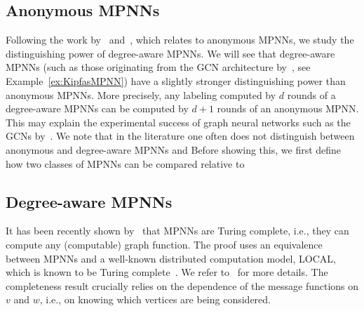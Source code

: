 
\subsection{Anonymous MPNNs}\label{subsec:aMPNNs}
Following the work by~\cite{xhlj19} and~\cite{grohewl}, which relates to anonymous MPNNs, we study the distinguishing power of degree-aware MPNNs. We will see that degree-aware MPNNs (such as those originating from the GCN architecture by~\cite{kipf-loose}, see Example~\ref{ex:KipfasMPNN}) have a slightly stronger distinguishing power than anonymous MPNNs.
More precisely, any labeling computed by $d$ rounds of a degree-aware MPNNs can be computed by $d+1$ rounds of an anonymous MPNN. This may explain the experimental success of graph neural networks such as the GCNs by~\cite{kipf-loose}. We note that in the literature one often does not distinguish between anonymous and degree-aware MPNNs
and 
Before showing this, we first define how two classes of MPNNs can be compared relative to

\subsection{Degree-aware MPNNs}\label{subsec:dMPNNs}


It has been recently shown by~\cite{Loukas2019} that MPNNs are Turing complete, i.e., they can compute any (computable) graph function. The proof uses an equivalence between MPNNs and a well-known distributed computation model, LOCAL, which is known to be Turing complete~\cite{Angluin}. We refer to~\cite{Loukas2019} for more details. The completeness result crucially relies on the dependence of the message functions on $v$ and $w$, i.e., on knowing which vertices are being considered. 

